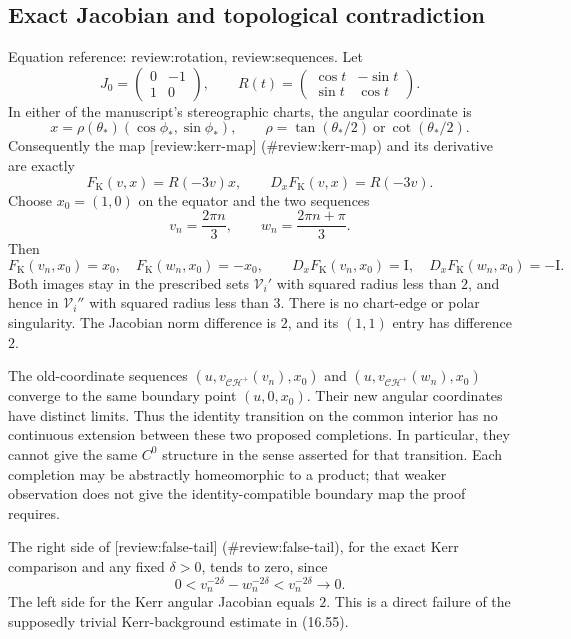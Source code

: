 \documentclass[10pt]{article}
\begin{document}
\subsection*{Exact Jacobian and topological contradiction}
Equation reference: review:rotation, review:sequences. Let \[J_0=\begin{pmatrix}0&-1\\1&0\end{pmatrix},
 \qquad
 R(t)=\begin{pmatrix}\cos t&-\sin t\\ \sin t&\cos t\end{pmatrix}.\] In either of the manuscript’s stereographic charts, the angular coordinate is \[x=\rho(\theta_*)(\cos\phi_*,\sin\phi_*),
 \qquad \rho=\tan(\theta_*/2)\ \text{or}\ \cot(\theta_*/2).\] Consequently the map [review:kerr-map] (\#review:kerr-map) and its derivative are exactly \[
 F_{\mathrm K}(v,x)=R(-3v)x,\qquad D_xF_{\mathrm K}(v,x)=R(-3v).\] Choose \(x_0=(1,0)\) on the equator and the two sequences \[
 v_n=\frac{2\pi n}{3},\qquad
 w_n=\frac{2\pi n+\pi}{3}.\] Then \[F_{\mathrm K}(v_n,x_0)=x_0,\quad F_{\mathrm K}(w_n,x_0)=-x_0,\qquad
 D_xF_{\mathrm K}(v_n,x_0)=\mathrm I,\quad D_xF_{\mathrm K}(w_n,x_0)=-\mathrm I.\] Both images stay in the prescribed sets \(\mathcal V_i'\) with squared radius less than \(2\), and hence in \(\mathcal V_i''\) with squared radius less than \(3\). There is no chart-edge or polar singularity. The Jacobian norm difference is \(2\), and its \((1,1)\) entry has difference \(2\).\par
The old-coordinate sequences \((u,v_{\mathcal{CH}^{+}}(v_n),x_0)\) and \((u,v_{\mathcal{CH}^{+}}(w_n),x_0)\) converge to the same boundary point \((u,0,x_0)\). Their new angular coordinates have distinct limits. Thus the identity transition on the common interior has no continuous extension between these two proposed completions. In particular, they cannot give the same \(C^0\) structure in the sense asserted for that transition. Each completion may be abstractly homeomorphic to a product; that weaker observation does not give the identity-compatible boundary map the proof requires.\par
The right side of [review:false-tail] (\#review:false-tail), for the exact Kerr comparison and any fixed \(\delta>0\), tends to zero, since \[0<v_n^{-2\delta}-w_n^{-2\delta}<v_n^{-2\delta}\longrightarrow0.\] The left side for the Kerr angular Jacobian equals \(2\). This is a direct failure of the supposedly trivial Kerr-background estimate in (16.55).\par
\end{document}
